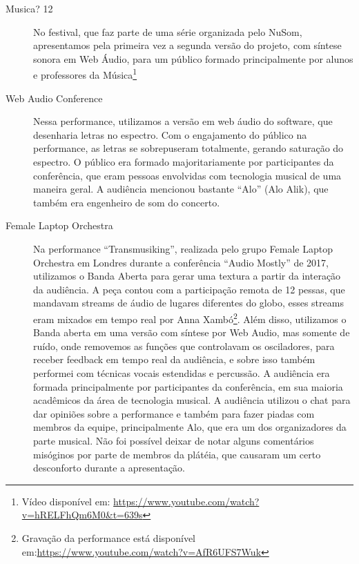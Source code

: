 \begin{description}
\item[Musica? 12]
No festival, que faz parte de uma série organizada pelo NuSom, apresentamos pela primeira vez a segunda versão do projeto, com síntese sonora em Web Áudio, para um público formado principalmente por alunos e professores da Música\footnote{Vídeo disponível em: \url{https://www.youtube.com/watch?v=hRELFhQm6M0&t=639s}}


\item[Web Audio Conference] 
Nessa performance, utilizamos a versão em web áudio do software, que desenharia letras no espectro. Com o engajamento do público na performance, as letras se sobrepuseram totalmente, gerando saturação do espectro. O público era formado majoritariamente por participantes da conferência, que eram pessoas envolvidas com tecnologia musical de uma maneira geral. A audiência mencionou bastante ``Alo'' (Alo Alik), que também era engenheiro de som do concerto. 

\item[Female Laptop Orchestra]
Na performance ``Transmusiking'', realizada pelo grupo Female Laptop Orchestra em Londres durante a conferência ``Audio Mostly'' de 2017, utilizamos o Banda Aberta para gerar uma textura a partir da interação da audiência. A peça contou com a participação remota de 12 pessas, que mandavam streams de áudio de lugares diferentes do globo, esses streams eram mixados em tempo real por Anna Xambó\footnote{Gravação da performance está disponível em:\url{https://www.youtube.com/watch?v=AfR6UFS7Wuk}}. Além disso, utilizamos o Banda aberta em uma versão com síntese por Web Audio, mas somente de ruído, onde removemos as funções que controlavam os osciladores, para receber feedback em tempo real da audiência, e sobre isso também performei com técnicas vocais estendidas e percussão. A audiência era formada principalmente por participantes da conferência, em sua maioria acadêmicos da área de tecnologia musical. A audiência utilizou o chat para dar opiniões sobre a performance e também para fazer piadas com membros da equipe, principalmente Alo, que era um dos organizadores da parte musical. Não foi possível deixar de notar alguns comentários misóginos por parte de membros da plátéia, que causaram um certo desconforto durante a apresentação. 



\end{description}

